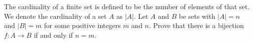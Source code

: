 \begin{comment}

\ExerciseSolution 

\ba

\item Let $A = \{1,2\}$ and $B = \{3,4\}$. Then $\{1\} \times \{2\} = \{1,2\}$ is a subset of $A \times B$ that is of the form $X \times Y$ with $X \subset A$ and $Y \subset B$.   

\item Let $A$ and $B$ be sets, both of which have at least two distinct members. Let $a_1$ and $a_2$ be distinct elements of $A$ and $b_1$, $b_2$ distinct elements of $B$. Let $W = \{(a_1,b_2), (a_2, b_1)\}$. Since the elements of $W$ are ordered pairs of elements, first from $A$, then from $B$, it follows that $W \subset A \times B$. To show that $W$ is not a Cartesian product of a subset of $A$ with a subset of $B$, we proceed by contradiction and suppose that $W = A' \times B'$ for some subsets $A'$ of $A$ and $B'$ of $B$. Since $(a_1, b_2)$ and $(a_2, b_1)$ are in $W$, it follows that $a_1, a_2 \in A'$ and $b_1, b_2 \in B'$. But then $(a_2, b_2) \in A' \times B'$. The fact that $(a_2,b_2) \notin W$ contradicts the fact that $W = A' \times B'$. We conclude that the assumption that led us to this contradiction is false, and that $W$ is is not the Cartesian product of a subset of $A$ with a subset of $B$. 

\ea

\end{comment}

\item The cardinality of a finite set is defined to be the number of elements of that set. We denote the cardinality of a set $A$ as $|A|$.  Let $A$ and $B$ be sets with $|A| = n$ and $|B| = m$ for some positive integers $m$ and $n$. Prove that there is a bijection $f: A \to B$ if and only if $n = m$. 

